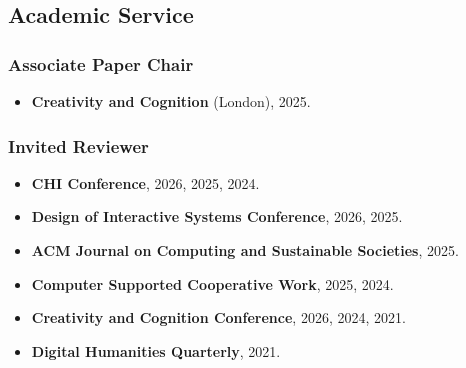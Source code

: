 \subsection{Academic Service}

\subsubsection{Associate Paper Chair}
\begin{itemize}
    \item \textbf{Creativity and Cognition} (London), 2025.
\end{itemize}

\subsubsection{Invited Reviewer}
\begin{itemize}
    \item \textbf{CHI Conference}, 2026, 2025, 2024.
    \item \textbf{Design of Interactive Systems Conference}, 2026, 2025.
    \item \textbf{ACM Journal on Computing and Sustainable Societies}, 2025.
    \item \textbf{Computer Supported Cooperative Work}, 2025, 2024.
    \item \textbf{Creativity and Cognition Conference}, 2026, 2024, 2021.
    \item \textbf{Digital Humanities Quarterly}, 2021.
\end{itemize}
